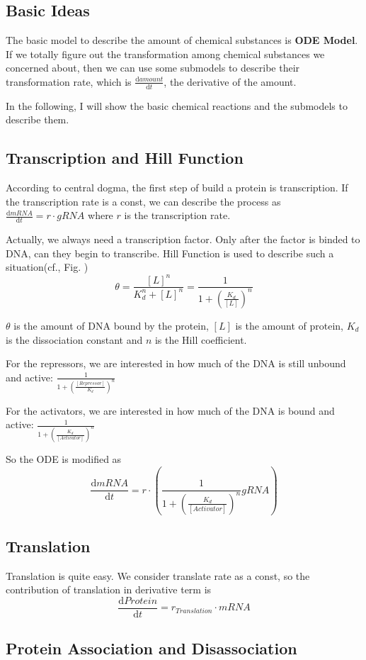 \documentclass[12pt]{article}
\begin{document}
\subsection{Basic Ideas}
The basic model to describe the amount of chemical substances is \textbf{ODE Model}. If we totally figure out the transformation among chemical substances we concerned about, then we can use some submodels to describe their transformation rate, which is $\frac{\mathrm{d}amount}{\mathrm{d}t}$, the derivative of the amount.

In the following, I will show the basic chemical reactions and the submodels to describe them.
\subsection{Transcription and Hill Function}
According to central dogma, the first step of build a protein is transcription. If the transcription rate is a const, we can describe the process as $\frac{\mathrm{d}mRNA}{\mathrm{d}t} = r \cdot gRNA$ where $r$ is the transcription rate.

Actually, we always need a transcription factor. Only after the factor is binded to DNA, can they begin to transcribe. Hill Function is used to describe such a situation(cf., Fig. )
\begin{equation}
    \theta = \frac{[L]^n}{K_d^n + [L]^n} = \frac{1}{1 + (\frac{K_d}{[L]})^n} 
\end{equation}

$\theta$ is the amount of DNA bound by the protein, $[L]$ is the amount of protein, $K_d$ is the dissociation constant and $n$ is the Hill coefficient.

For the repressors, we are interested in how much of the DNA is still unbound and active: $\frac{1}{1 + (\frac{[Repressor]}{K_d})^n}$

For the activators, we are interested in how much of the DNA is bound and active: $ \frac{1}{1 + (\frac{K_d}{[Activator]})^n}$

So the ODE is modified as $$\frac{\mathrm{d}mRNA}{\mathrm{d}t} = r \cdot (\frac{1}{1 + (\frac{K_d}{[Activator]})^n} gRNA)$$
\subsection{Translation}
Translation is quite easy. We consider translate rate as a const, so the contribution of translation in derivative term is $$\frac{\mathrm{d}Protein}{\mathrm{d}t} = r_{Translation} \cdot mRNA$$
\subsection{Protein Association and Disassociation}
\end{document}
